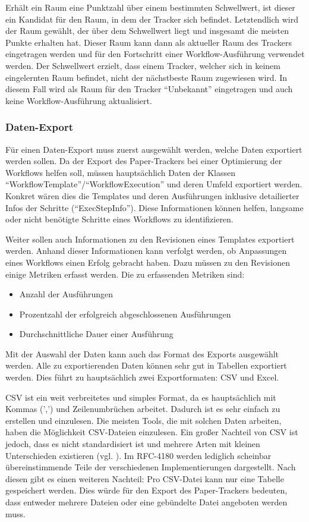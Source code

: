 Erhält ein Raum eine Punktzahl über einem bestimmten Schwellwert, ist dieser ein Kandidat für den Raum, in dem der Tracker
sich befindet.
Letztendlich wird der Raum gewählt, der über dem Schwellwert liegt und insgesamt die meisten Punkte erhalten hat.
Dieser Raum kann dann als aktueller Raum des Trackers eingetragen werden und für den Fortschritt einer Workflow-Ausführung
verwendet werden.
Der Schwellwert erzielt, dass einem Tracker, welcher sich in keinem eingelernten Raum befindet, nicht der nächstbeste
Raum zugewiesen wird. 
In diesem Fall wird als Raum für den Tracker \enquote{Unbekannt} eingetragen und auch keine Workflow-Ausführung aktualisiert.

\subsubsection{Daten-Export}

Für einen Daten-Export muss zuerst ausgewählt werden, welche Daten exportiert werden sollen.
Da der Export des Paper-Trackers bei einer Optimierung der Workflows helfen soll, müssen hauptsächlich Daten der
Klassen \enquote{WorkflowTemplate}/\enquote{WorkflowExecution} und deren Umfeld exportiert werden.
Konkret wären dies die Templates und deren Ausführungen inklusive detailierter Infos der Schritte (\enquote{ExecStepInfo}).
Diese Informationen können helfen, langsame oder nicht benötigte Schritte eines Workflows zu identifizieren.

Weiter sollen auch Informationen zu den Revisionen eines Templates exportiert werden.
Anhand dieser Informationen kann verfolgt werden, ob Anpassungen eines Workflows einen Erfolg gebracht haben.
Dazu müssen zu den Revisionen einige Metriken erfasst werden.
Die zu erfassenden Metriken sind:
\begin{itemize}
	\item Anzahl der Ausführungen
	\item Prozentzahl der erfolgreich abgeschlossenen Ausführungen
	\item Durchschnittliche Dauer einer Ausführung
\end{itemize}

Mit der Auswahl der Daten kann auch das Format des Exports ausgewählt werden.
Alle zu exportierenden Daten können sehr gut in Tabellen exportiert werden.
Dies führt zu hauptsächlich zwei Exportformaten: \gls{CSV} und Excel.

\gls{CSV} ist ein weit verbreitetes und simples Format, da es hauptsächlich mit Kommas (',') und Zeilenumbrüchen arbeitet.
Dadurch ist es sehr einfach zu erstellen und einzulesen.
Die meisten Tools, die mit solchen Daten arbeiten, haben die Möglichkeit \gls{CSV}-Dateien einzulesen.
Ein großer Nachteil von \gls{CSV} ist jedoch, dass es nicht standardisiert ist und mehrere Arten
mit kleinen Unterschieden existieren (vgl. \cite{rfc4180}).
Im RFC-4180 werden lediglich scheinbar übereinstimmende Teile der verschiedenen Implementierungen dargestellt.
Nach diesen gibt es einen weiteren Nachteil: Pro \gls{CSV}-Datei kann nur eine Tabelle gespeichert werden.
Dies würde für den Export des Paper-Trackers bedeuten, dass entweder mehrere Dateien oder eine gebündelte Datei angeboten werden muss.

